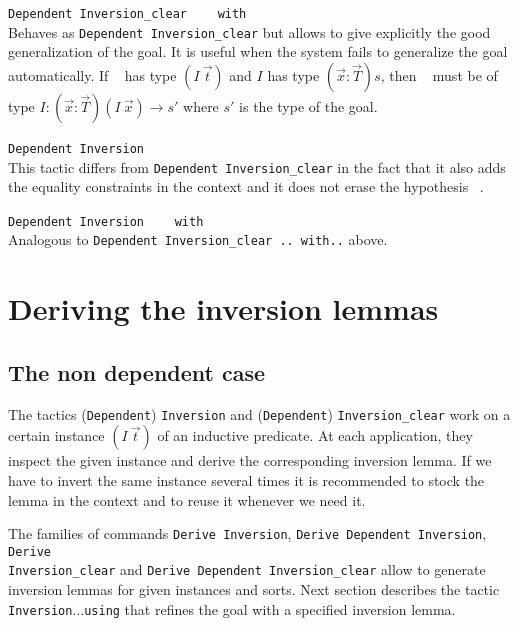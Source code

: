 \begin{Variants}

\item \texttt{Dependent Inversion\_clear } \ident~ \texttt{ with } \term\\
 \noindent Behaves as \texttt{Dependent Inversion\_clear} but allows to give
  explicitly the good generalization of the goal. It is useful when
  the system fails to generalize the goal automatically. If
  \ident~ has type $(I~\vec{t})$ and $I$ has type
  $(\vec{x}:\vec{T})s$,   then \term~  must be of type
  $I:(\vec{x}:\vec{T})(I~\vec{x})\rightarrow s'$ where $s'$ is the
  type of the goal.



\item \texttt{Dependent Inversion} \ident~\\
 This tactic differs from   \texttt{Dependent Inversion\_clear} in the fact that
  it also  adds the equality constraints in the context and
  it does not erase  the hypothesis \ident~.

\item \texttt{Dependent Inversion } \ident~ \texttt{ with } \term \\
  Analogous to \texttt{Dependent Inversion\_clear .. with..} above. 
\end{Variants}



\section{Deriving the inversion lemmas}
\label{inversion_derivation}
\subsection{The non dependent case}

The tactics (\texttt{Dependent}) \texttt{Inversion} and (\texttt{Dependent})
{\tt Inversion\_clear} work on a
certain instance $(I~\vec{t})$ of an inductive predicate. At each
application, they inspect the given instance and derive the
corresponding inversion lemma.  If we have to invert the same
instance several times it is recommended to stock the lemma in the
context and to reuse it whenever we need it.

The families of commands \texttt{Derive Inversion}, \texttt{Derive
Dependent Inversion}, \texttt{Derive} \\ {\tt Inversion\_clear} and \texttt{Derive Dependent Inversion\_clear}
allow to generate inversion lemmas for given instances and sorts.  Next
section describes the tactic \texttt{Inversion}$\ldots$\texttt{using} that refines the
goal with a specified inversion lemma.

